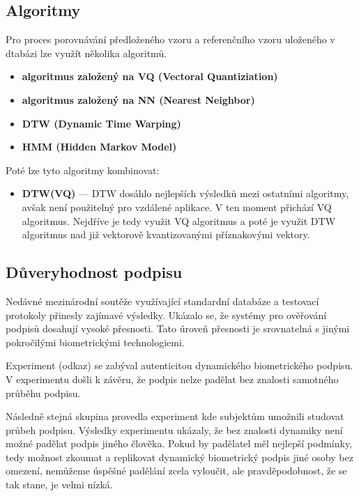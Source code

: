 \subsection*{Algoritmy}
Pro proces porovnávání předloženého vzoru a referenčního vzoru uloženého v dtabázi lze využít několika algoritmů.

\begin{itemize}
  \item \textbf{algoritmus založený na VQ (Vectoral Quantiziation)}
  \item \textbf{algoritmus založený na NN (Nearest Neighbor)}
  \item \textbf{DTW (Dynamic Time Warping)}
  \item \textbf{HMM (Hidden Markov Model)}
\end{itemize}

Poté lze tyto algoritmy kombinovat:
\begin{itemize}
  \item \textbf{DTW(VQ)} --- DTW dosáhlo nejlepších výsledků mezi ostatními algoritmy, avšak není použitelný pro vzdálené aplikace.
  V ten moment přichází VQ algoritmus. Nejdříve je tedy využit VQ algoritmus a poté je využit DTW algoritmus nad již vektorově kvantizovanými příznakovými vektory. 
\end{itemize}

\subsection*{Důveryhodnost podpisu}
Nedávné mezinárodní soutěže využívající standardní databáze a testovací protokoly přinesly zajímavé výsledky.   %
Ukázalo se, že systémy pro ověřování podpisů dosahují vysoké přesnosti.                                         %
Tato úroveň přesnosti je srovnatelná s jinými pokročilými biometrickými technologiemi.                          %

Experiment (odkaz) se zabýval autenticitou dynamického biometrického podpisu.
V experimentu došli k závěru, že podpis nelze padělat bez znalosti samotného průběhu podpisu. %

Následně stejná skupina provedla experiment kde subjektům umožnili studovat průbeh podpisu.
Výsledky experimentu ukázaly, že bez znalosti dynamiky není možné padělat podpis jiného člověka. 
Pokud by padělatel měl nejlepší podmínky, tedy možnost zkoumat a replikovat dynamický biometrický podpis jiné osoby bez omezení, 
nemůžeme úspěšné padělání zcela vyloučit, ale pravděpodobnost, že se tak stane, je velmi nízká. %

